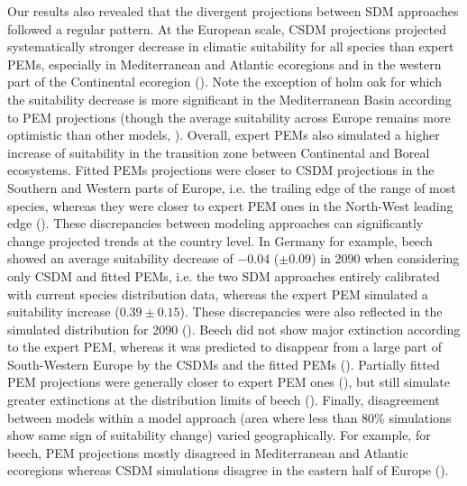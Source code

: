 Our results also revealed that the divergent projections between SDM approaches followed a regular pattern. 
At the European scale, CSDM projections projected systematically stronger decrease in climatic suitability for all species than expert PEMs, especially in Mediterranean and Atlantic ecoregions and in the western part of the Continental ecoregion (). Note the exception of holm oak for which the suitability decrease is more significant in the Mediterranean Basin according to PEM projections (though the average suitability across Europe remains more optimistic than other models, ). Overall, expert PEMs also simulated a higher increase of suitability in the transition zone between Continental and Boreal ecosystems. Fitted PEMs  projections were closer to CSDM projections in the Southern and Western parts of Europe, i.e. the trailing edge of the range of most species, whereas they were closer to expert PEM ones in the North-West leading edge (). These discrepancies between modeling approaches can significantly change projected trends at the country level. In Germany for example, beech showed an average suitability decrease of $-0.04$ ($\pm0.09$) in 2090 when considering only CSDM and fitted PEMs, i.e. the two SDM approaches entirely calibrated with current species distribution data, whereas the expert PEM simulated a suitability increase ($0.39\pm0.15$). These discrepancies were also reflected in the simulated distribution for 2090 (). Beech did not show major extinction according to the expert PEM, whereas it was predicted to disappear from a large part of South-Western Europe by the CSDMs and the fitted PEMs (). Partially fitted PEM projections were generally closer to expert PEM ones (), but still simulate greater extinctions at the distribution limits of beech ().
Finally, disagreement between models within a model approach (area where less than 80\% simulations show same sign of suitability change) varied geographically. For example, for beech, PEM projections mostly  disagreed in Mediterranean and Atlantic ecoregions whereas CSDM simulations disagree in the eastern half of Europe ().


